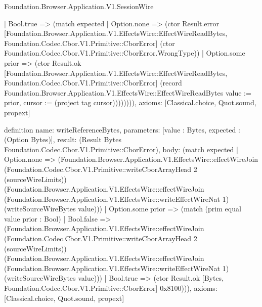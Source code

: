 \begin{lexlean}{Foundation.Browser.Application.V1.SessionWire}
\begin{semanticmodule}
{          | Bool.true => (match expected
            | Option.none => (ctor Result.error [Foundation.Browser.Application.V1.EffectsWire::EffectWireReadBytes, Foundation.Codec.Cbor.V1.Primitive::CborError] (ctor Foundation.Codec.Cbor.V1.Primitive::CborError.WrongType))
            | Option.some prior => (ctor Result.ok [Foundation.Browser.Application.V1.EffectsWire::EffectWireReadBytes, Foundation.Codec.Cbor.V1.Primitive::CborError] (record Foundation.Browser.Application.V1.EffectsWire::EffectWireReadBytes {value := prior, cursor := (project tag cursor)}))))))),
  axioms: [Classical.choice, Quot.sound, propext]
}

definition{
  name: writeReferenceBytes,
  parameters: [value : Bytes, expected : (Option Bytes)],
  result: (Result Bytes Foundation.Codec.Cbor.V1.Primitive::CborError),
  body: (match expected
    | Option.none => (Foundation.Browser.Application.V1.EffectsWire::effectWireJoin (Foundation.Codec.Cbor.V1.Primitive::writeCborArrayHead 2 (sourceWireLimits)) (Foundation.Browser.Application.V1.EffectsWire::effectWireJoin (Foundation.Browser.Application.V1.EffectsWire::writeEffectWireNat 1) (writeSourceWireBytes value)))
    | Option.some prior => (match (prim equal value prior : Bool)
      | Bool.false => (Foundation.Browser.Application.V1.EffectsWire::effectWireJoin (Foundation.Codec.Cbor.V1.Primitive::writeCborArrayHead 2 (sourceWireLimits)) (Foundation.Browser.Application.V1.EffectsWire::effectWireJoin (Foundation.Browser.Application.V1.EffectsWire::writeEffectWireNat 1) (writeSourceWireBytes value)))
      | Bool.true => (ctor Result.ok [Bytes, Foundation.Codec.Cbor.V1.Primitive::CborError] 0x8100))),
  axioms: [Classical.choice, Quot.sound, propext]
}


\end{semanticmodule}
\end{lexlean}
